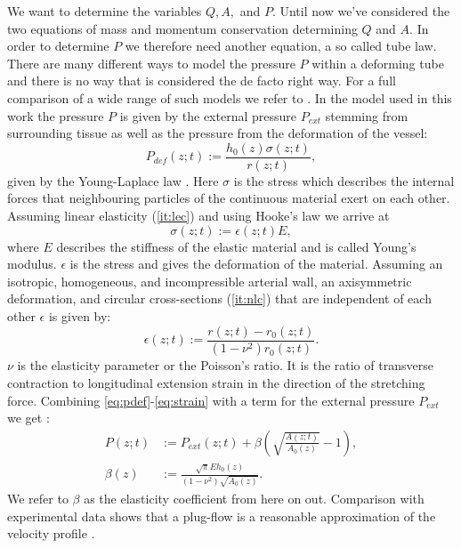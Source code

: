 \documentclass[a4paper, oneside]{discothesis}
\begin{document}
We want to determine the variables $Q, A,$ and $P$.
Until now we've considered the two equations of mass and momentum conservation determining $Q$ and $A$.
In order to determine $P$ we therefore need another equation, a so called tube law.
There are many different ways to model the pressure $P$ within a deforming tube and there is no way that is considered the de facto right way.
For a full comparison of a wide range of such models we refer to \cite{gomez2017analysis}.
In the model used in this work the pressure $P$ is given by the external pressure $P_{ext}$ stemming from surrounding tissue as well as the pressure from the deformation of the vessel:
\begin{equation}
	P_{def}(z;t) := \frac{h_0(z) \sigma(z;t)}{r(z;t)}, \label{eq:pdef}
\end{equation}
given by the Young-Laplace law \cite{laplace1805traité} \cite{young1804essay}.
Here $\sigma$ is the stress which describes the internal forces that neighbouring particles of the continuous material exert on each other.
Assuming linear elasticity (\autoref{it:lec}) and using Hooke's law \cite{hooke1678lectures} we arrive at
\begin{equation}
	\sigma(z;t) := \epsilon(z;t) E \label{eq:stress},
\end{equation}
where $E$ describes the stiffness of the elastic material and is called Young's modulus.
$\epsilon$ is the stress and gives the deformation of the material.
Assuming an isotropic, homogeneous, and incompressible arterial wall, an axisymmetric deformation, and circular cross-sections (\autoref{it:nlc}) that are independent of each other $\epsilon$ is given by:
\begin{equation}
	\epsilon(z;t) := \frac{r(z;t)-r_0(z;t)}{ (1-\nu^2) r_0(z;t)}. \label{eq:strain}
\end{equation}
$\nu$ is the elasticity parameter or the Poisson's ratio.
It is the ratio of transverse contraction to longitudinal extension strain in the direction of the stretching force.
Combining \autoref{eq:pdef}-\autoref{eq:strain} with a term for the external pressure $P_{ext}$ we get \cite{sherwin2003one} \cite{sherwin2003computational}: 
\begin{align}
	P(z;t) &:= P_{ext}(z;t) + \beta \left( \sqrt{\frac{A(z;t)}{A_0(z)}}-1 \right),  \label{eq:p_tot}\\
	\beta(z) &:=  \frac{\sqrt{\pi} E h_0(z)}{(1-\nu^2) \sqrt{A_0(z)}}.
\end{align}
We refer to $\beta$ as the elasticity coefficient from here on out.
Comparison with experimental data shows that a plug-flow is a reasonable approximation of the velocity profile \cite{hunter1972numerical} \cite{smith2000generation} \cite{smith2002anatomically}.
\end{document}
